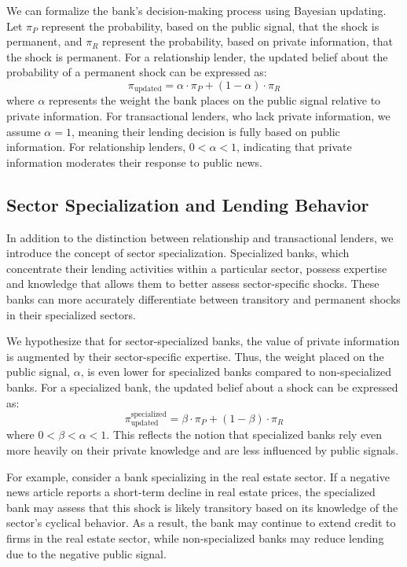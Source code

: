 We can formalize the bank's decision-making process using Bayesian updating. Let $\pi_P$ represent the probability, based on the public signal, that the shock is permanent, and $\pi_R$ represent the probability, based on private information, that the shock is permanent. For a relationship lender, the updated belief about the probability of a permanent shock can be expressed as:
\[
\pi_{\text{updated}} = \alpha \cdot \pi_P + (1 - \alpha) \cdot \pi_R
\]
where $\alpha$ represents the weight the bank places on the public signal relative to private information. For transactional lenders, who lack private information, we assume $\alpha = 1$, meaning their lending decision is fully based on public information. For relationship lenders, $0 < \alpha < 1$, indicating that private information moderates their response to public news.

\subsection{Sector Specialization and Lending Behavior}

In addition to the distinction between relationship and transactional lenders, we introduce the concept of sector specialization. Specialized banks, which concentrate their lending activities within a particular sector, possess expertise and knowledge that allows them to better assess sector-specific shocks. These banks can more accurately differentiate between transitory and permanent shocks in their specialized sectors.

We hypothesize that for sector-specialized banks, the value of private information is augmented by their sector-specific expertise. Thus, the weight placed on the public signal, $\alpha$, is even lower for specialized banks compared to non-specialized banks. For a specialized bank, the updated belief about a shock can be expressed as:
\[
\pi_{\text{updated}}^{\text{specialized}} = \beta \cdot \pi_P + (1 - \beta) \cdot \pi_R
\]
where $0 < \beta < \alpha < 1$. This reflects the notion that specialized banks rely even more heavily on their private knowledge and are less influenced by public signals. 

For example, consider a bank specializing in the real estate sector. If a negative news article reports a short-term decline in real estate prices, the specialized bank may assess that this shock is likely transitory based on its knowledge of the sector's cyclical behavior. As a result, the bank may continue to extend credit to firms in the real estate sector, while non-specialized banks may reduce lending due to the negative public signal.

